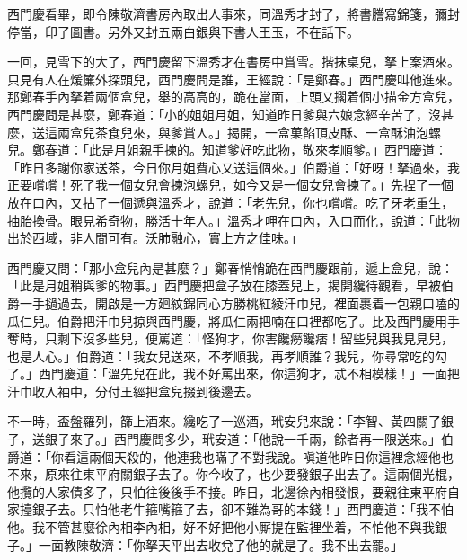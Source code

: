 西門慶看畢，即令陳敬濟書房內取出人事來，同溫秀才封了，將書謄寫錦箋，彌封停當，印了圖書。另外又封五兩白銀與下書人王玉，不在話下。

一回，見雪下的大了，西門慶留下溫秀才在書房中賞雪。揩抹桌兒，拏上案酒來。只見有人在煖簾外探頭兒，西門慶問是誰，王經說：「是鄭春。」西門慶叫他進來。那鄭春手內拏着兩個盒兒，舉的高高的，跪在當面，上頭又擱着個小描金方盒兒，西門慶問是甚麼，鄭春道：「小的姐姐月姐，知道昨日爹與六娘念經辛苦了，沒甚麼，送這兩盒兒茶食兒來，與爹賞人。」揭開，一盒菓餡頂皮酥、一盒酥油泡螺兒。鄭春道：「此是月姐親手揀的。知道爹好吃此物，敬來孝順爹。」西門慶道：「昨日多謝你家送茶，今日你月姐費心又送這個來。」伯爵道：「好呀！拏過來，我正要嚐嚐！死了我一個女兒會揀泡螺兒，如今又是一個女兒會揀了。」先捏了一個放在口內，又拈了一個遞與溫秀才，說道：「老先兒，你也嚐嚐。吃了牙老重生，抽胎換骨。眼見希奇物，勝活十年人。」{}溫秀才呷在口內，入口而化，說道：「此物出於西域，非人間可有。沃肺融心，實上方之佳味。」

西門慶又問：「那小盒兒內是甚麼？」鄭春悄悄跪在西門慶跟前，遞上盒兒，說：「此是月姐稍與爹的物事。」西門慶把盒子放在膝蓋兒上，揭開纔待觀看，早被伯爵一手撾過去，開啟是一方廻紋錦同心方勝桃紅綾汗巾兒，裡面裹着一包親口嗑的瓜仁兒。伯爵把汗巾兒掠與西門慶，將瓜仁兩把喃在口裡都吃了。比及西門慶用手奪時，只剩下沒多些兒，{}便罵道：「怪狗才，你害饞癆饞痞！留些兒與我見見兒，也是人心。」伯爵道：「我女兒送來，不孝順我，再孝順誰？我兒，你尋常吃的勾了。」{}西門慶道：「溫先兒在此，我不好罵出來，你這狗才，忒不相模樣！」一面把汗巾收入袖中，分付王經把盒兒掇到後邊去。

不一時，盃盤羅列，篩上酒來。纔吃了一巡酒，玳安兒來說：「李智、黃四關了銀子，送銀子來了。」西門慶問多少，玳安道：「他說一千兩，餘者再一限送來。」伯爵道：「你看這兩個天殺的，他連我也瞞了不對我說。嗔道他昨日你這裡念經他也不來，原來往東平府關銀子去了。你今收了，也少要發銀子出去了。這兩個光棍，他攬的人家債多了，只怕往後後手不接。昨日，北邊徐內相發恨，要親往東平府自家擡銀子去。只怕他老牛箍嘴箍了去，卻不難為哥的本錢！」{}西門慶道：「我不怕他。我不管甚麼徐內相李內相，好不好把他小厮提在監裡坐着，不怕他不與我銀子。」一面教陳敬濟：「你拏天平出去收兌了他的就是了。我不出去罷。」

